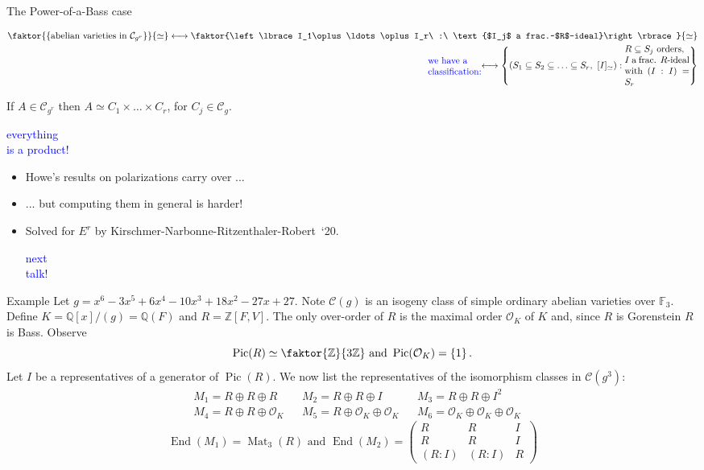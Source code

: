 \documentclass[usenames,dvipsnames,handout]{beamer}
\def\Q{\mathbb{Q}}
\def\Z{\mathbb{Z}}
\def\F{\mathbb{F}}
\DeclareMathOperator{\Mat}{Mat}
\DeclareMathOperator{\Pic}{Pic}
\DeclareMathOperator{\End}{End}
\newcommand{\cC}{{\mathcal C}}
\newcommand{\cO}{{\mathcal O}}
\newcommand{\set}[1]{\left\lbrace#1\right\rbrace }
\newcommand{\blue}[1]{\textcolor{blue}{#1}}
\begin{document}
\begin{frame}{ The Power-of-a-Bass case }
	\begin{theorem}
	\begin{align*}
	\faktor{\set{\text{abelian varieties in }\cC_{g^r}}}{ \simeq } 
	\longleftrightarrow
	\faktor{\set{I_1\oplus\ldots\oplus I_r\ :\ \text{$I_j$ a frac.~$R$-ideal}}}{\simeq}&\\
	\blue{\parbox{5.5em}{we have a\\ classification:}}
	\longleftrightarrow
	\set{(S_1\subseteq S_2 \subseteq \ldots \subseteq S_r ,\ [I]_{\simeq}) :          
	\parbox{7em}{$R\subseteq S_j$ orders,\\ $I$ a frac. $R$-ideal with $(I:I)=S_r$}}&
    \end{align*}
    \end{theorem}
\pause    
    \begin{corollary}
	If $A\in \cC_{g^r}$ then $A \simeq C_1\times \ldots \times C_r$, for $C_j\in\cC_g$.     
\pause
    \blue{\parbox{8em}{everything\\ is a product!}}
    \end{corollary}
    \begin{itemize}
    \item Howe's results on polarizations carry over ...
\pause    
    \item ... but computing them in general is harder!
\pause    
    \item Solved for $E^r$ by Kirschmer-Narbonne-Ritzenthaler-Robert~`20.
    \blue{\parbox{3em}{next\\talk!}}
	\end{itemize}
\end{frame}

\begin{frame}{ Example }
    Let $g=x^6 - 3x^5 + 6x^4 - 10x^3 + 18x^2 - 27x + 27$.   
    Note $\cC(g)$ is an isogeny class of simple ordinary abelian varieties over $\F_3$.   
    Define $K=\Q[x]/(g)=\Q(F)$ and $R=\Z[F,V]$.
\pause
    The only over-order of $R$ is the maximal order $\cO_K$ of $K$ and, since $R$ is Gorenstein $R$ is Bass. 
\pause
    Observe
    \[ \Pic(R) \simeq \faktor{\Z}{3\Z} \text{ and } \Pic(\cO_K)=\set{1}. \]
    Let $I$ be a representatives of a generator of $\Pic(R)$.
\pause
    We now list the representatives of the isomorphism classes in $\cC(g^3)$:
    \begin{align*}
	& M_1=R \oplus R \oplus R &
	& M_2=R \oplus R \oplus I &
	& M_3=R \oplus R \oplus I^2 \\
	& M_4=R \oplus R \oplus \cO_K & 
	& M_5=R \oplus \cO_K \oplus \cO_K & 
	& M_6=\cO_K \oplus \cO_K \oplus \cO_K
	\end{align*}
\pause 
	\[\End(M_1) = \Mat_3(R) \text{ and }
	\End(M_2)=
	\begin{pmatrix}
	R & R & I \\
	R & R & I \\
	(R:I) & (R:I) & R
	\end{pmatrix}\]
\end{frame}
\end{document}
